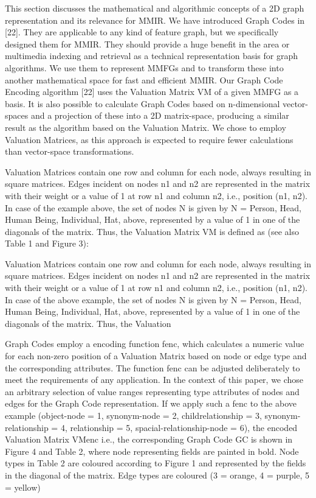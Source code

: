 This section discusses the mathematical and algorithmic concepts of a 2D graph representation and its relevance for MMIR. We have introduced Graph Codes in [22]. They are applicable to any kind of feature graph, but we specifically designed them for MMIR. They should provide a huge benefit in the area or multimedia indexing and retrieval as a technical representation basis for graph algorithms. We use them to represent MMFGs and to transform these into another mathematical space for fast and efficient MMIR. Our Graph Code Encoding algorithm [22] uses the Valuation Matrix VM of a given MMFG as a basis. It is also possible to calculate Graph Codes based on n-dimensional vector-spaces and a projection of these into a 2D matrix-space, producing a similar result as the algorithm based on the Valuation Matrix. We chose to employ Valuation Matrices, as this approach is expected to require fewer calculations than vector-space transformations.


Valuation Matrices contain one row and column for each node, always resulting in
square matrices. Edges incident on nodes n1 and n2 are represented in the matrix with
their weight or a value of 1 at row n1 and column n2, i.e., position (n1, n2). In case of
the example above, the set of nodes N is given by N = {Person, Head, Human Being,
Individual, Hat, above}, represented by a value of 1 in one of the diagonals of the matrix.
Thus, the Valuation Matrix VM is defined as (see also Table 1 and Figure 3):

Valuation Matrices contain one row and column for each node, always resulting in
square matrices. Edges incident on nodes n1 and n2 are represented in the matrix with their
weight or a value of 1 at row n1 and column n2, i.e., position (n1, n2). In case of the above
example, the set of nodes N is given by N = {Person, Head, Human Being, Individual, Hat,
above}, represented by a value of 1 in one of the diagonals of the matrix. Thus, the Valuation

Graph Codes employ a encoding function fenc, which calculates a numeric value for
each non-zero position of a Valuation Matrix based on node or edge type and the corresponding attributes. The function fenc can be adjusted deliberately to meet the requirements
of any application. In the context of this paper, we chose an arbitrary selection of value
ranges representing type attributes of nodes and edges for the Graph Code representation.
If we apply such a fenc to the above example (object-node = 1, synonym-node = 2, childrelationship = 3, synonym-relationship = 4, relationship = 5, spacial-relationship-node = 6),
the encoded Valuation Matrix VMenc i.e., the corresponding Graph Code GC is shown in
Figure 4 and Table 2, where node representing fields are painted in bold. Node types in
Table 2 are coloured according to Figure 1 and represented by the fields in the diagonal of
the matrix. Edge types are coloured (3 = orange, 4 = purple, 5 = yellow)

